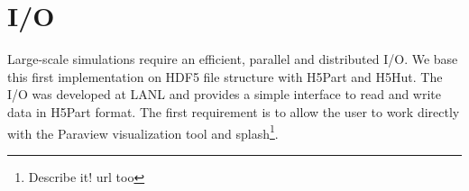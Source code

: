 \documentclass[notes.tex]{subfiles}
\begin{document}
\section{I/O}
Large-scale simulations require an efficient, parallel and distributed I/O.
We base this first implementation on HDF5 file structure with H5Part and H5Hut.
The I/O was developed at LANL and provides a simple interface to read and write
data in H5Part format.
The first requirement is to allow the user to work directly with the Paraview
visualization tool and splash\footnote{Describe it! url too}.
\end{document}

